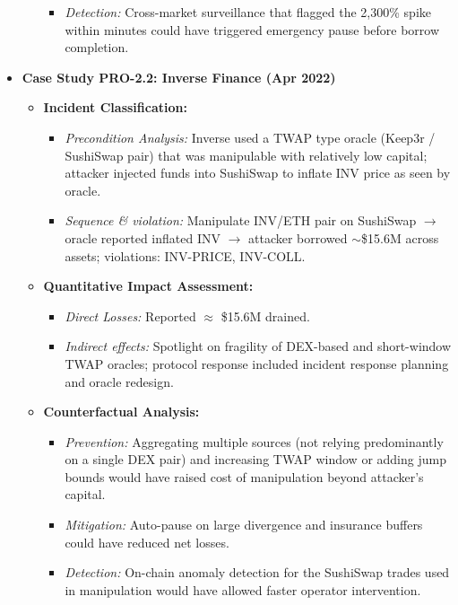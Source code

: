 \begin{itemize}
\begin{itemize}
\begin{itemize}
                    \item \textit{Detection:} Cross-market surveillance that flagged the 2,300\% spike within minutes could have triggered emergency pause before borrow completion. \cite{solidus2022mango}
                \end{itemize}
        \end{itemize}
    \item \textbf{Case Study PRO-2.2: Inverse Finance (Apr 2022)}
        \begin{itemize}
            \item \textbf{Incident Classification:}
                \begin{itemize}
                    \item \textit{Precondition Analysis:} Inverse used a TWAP type oracle (Keep3r / SushiSwap pair) that was manipulable with relatively low capital; attacker injected funds into SushiSwap to inflate INV price as seen by oracle. \cite{kessler2022exploit}
                    \item \textit{Sequence \& violation:} Manipulate INV/ETH pair on SushiSwap $\rightarrow$ oracle reported inflated INV $\rightarrow$ attacker borrowed $\sim$\$15.6M across assets; violations: INV-PRICE, INV-COLL. \cite{kessler2022exploit}
                \end{itemize}
            \item \textbf{Quantitative Impact Assessment:}
                \begin{itemize}
                    \item \textit{Direct Losses:} Reported $\approx$ \$15.6M drained. \cite{kessler2022exploit}
                    \item \textit{Indirect effects:} Spotlight on fragility of DEX-based and short-window TWAP oracles; protocol response included incident response planning and oracle redesign.
                \end{itemize}
            \item \textbf{Counterfactual Analysis:}
                \begin{itemize}
                    \item \textit{Prevention:} Aggregating multiple sources (not relying predominantly on a single DEX pair) and increasing TWAP window or adding jump bounds would have raised cost of manipulation beyond attacker's capital. \cite{chainlink2021defi, bai2024ormer}
                    \item \textit{Mitigation:} Auto-pause on large divergence and insurance buffers could have reduced net losses.
                    \item \textit{Detection:} On-chain anomaly detection for the SushiSwap trades used in manipulation would have allowed faster operator intervention. \cite{kessler2022exploit}
                \end{itemize}
        \end{itemize}
\end{itemize}

